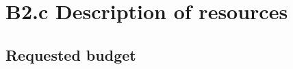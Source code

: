 \documentclass[11pt,a4paper]{report}
\newcommand{\eu}[1]{}
\begin{document}


\newpage
\printbibliography

\newrefsection
\newpage
\chapter{B2.c Description of resources}

\eu{Has to be provided online; 8000 chars max (eg 2 pages)}


\section{Requested budget}
\end{document}
